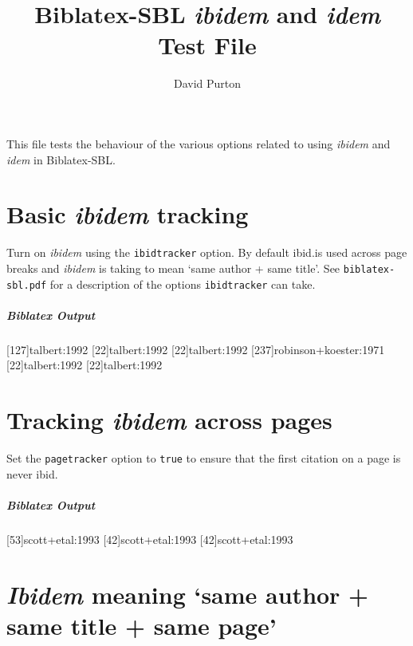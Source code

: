 \documentclass{article}
\title{Biblatex-SBL \emph{ibidem} and \emph{idem} Test File}
\author{David Purton}
\date{\printdateTeX{\sbl@abx@date}}
\newenvironment{biboutput}{%
  \subparagraph{Biblatex Output}
}{\color{black}}
\begin{document}
\maketitle

This file tests the behaviour of the various options related to using
\emph{ibidem} and \emph{idem} in Biblatex-SBL.

\section*{Basic \emph{ibidem} tracking}

Turn on \emph{ibidem} using the \texttt{ibidtracker} option. By default
ibid.\@ is used across page breaks and \emph{ibidem} is taking to mean ‘same
author + same title’. See \texttt{biblatex-sbl.pdf} for a description of the
options \texttt{ibidtracker} can take.


\begin{biboutput}
  [127]{talbert:1992}
  [22]{talbert:1992}
  [22]{talbert:1992}
  [237]{robinson+koester:1971}
  [22]{talbert:1992}
  \clearpage
  [22]{talbert:1992}
\end{biboutput}

\section*{Tracking \emph{ibidem} across pages}

Set the \texttt{pagetracker} option to \texttt{true} to ensure that the first
citation on a page is never ibid. 


\begin{biboutput}
  [53]{scott+etal:1993}
  [42]{scott+etal:1993}
  \clearpage
  [42]{scott+etal:1993}
\end{biboutput}

\section*{\emph{Ibidem} meaning ‘same author + same title + same page’}
\end{document}
